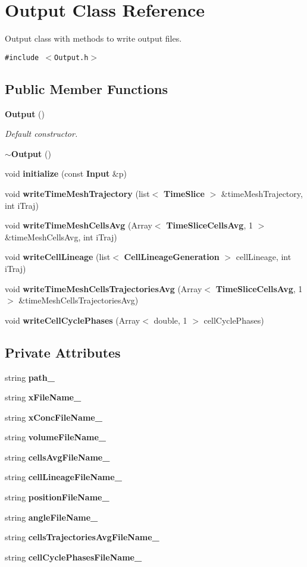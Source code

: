 \section{Output Class Reference}
\label{classOutput}
Output class with methods to write output files.  


{\tt \#include $<$Output.h$>$}

\subsection*{Public Member Functions}
\begin{CompactItemize}
\item 
{\bf Output} ()
\begin{CompactList}\small\item\em Default constructor. \item\end{CompactList}\item 
{\bf $\sim$Output} ()
\item 
void {\bf initialize} (const {\bf Input} \&p)
\item 
void {\bf writeTimeMeshTrajectory} (list$<$ {\bf TimeSlice} $>$ \&timeMeshTrajectory, int iTraj)
\item 
void {\bf writeTimeMeshCellsAvg} (Array$<$ {\bf TimeSliceCellsAvg}, 1 $>$ \&timeMeshCellsAvg, int iTraj)
\item 
void {\bf writeCellLineage} (list$<$ {\bf CellLineageGeneration} $>$ cellLineage, int iTraj)
\item 
void {\bf writeTimeMeshCellsTrajectoriesAvg} (Array$<$ {\bf TimeSliceCellsAvg}, 1 $>$ \&timeMeshCellsTrajectoriesAvg)
\item 
void {\bf writeCellCyclePhases} (Array$<$ double, 1 $>$ cellCyclePhases)
\end{CompactItemize}
\subsection*{Private Attributes}
\begin{CompactItemize}
\item 
string {\bf path\_\-}
\item 
string {\bf xFileName\_\-}
\item 
string {\bf xConcFileName\_\-}
\item 
string {\bf volumeFileName\_\-}
\item 
string {\bf cellsAvgFileName\_\-}
\item 
string {\bf cellLineageFileName\_\-}
\item 
string {\bf positionFileName\_\-}
\item 
string {\bf angleFileName\_\-}
\item 
string {\bf cellsTrajectoriesAvgFileName\_\-}
\item 
string {\bf cellCyclePhasesFileName\_\-}
\end{CompactItemize}


